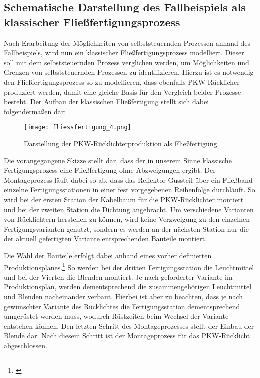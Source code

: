 \subsection{Schematische Darstellung des Fallbeispiels als klassischer
Fließfertigungsprozess}
\label{Modellierung}

Nach Erarbeitung der Möglichkeiten von selbststeuernden Prozessen anhand des
Fallbeispiels, wird nun ein klassischer Fließfertigungsprozess modelliert.
Dieser soll mit dem selbststeuernden Prozess verglichen werden, um Möglichkeiten
und Grenzen von selbststeuernden Prozessen zu identifizieren. Hierzu ist es
notwendig den Fließfertigungsprozess so zu modellieren, dass ebenfalls
PKW-Rücklicher produziert werden, damit eine gleiche Basis für den Vergleich
beider Prozesse besteht. Der Aufbau der klassischen Fließfertigung stellt sich
dabei folgendermaßen dar:

\begin{figure}[htb] 
\centering
\texttt{[image: fliessfertigung\_4.png]}
\caption[Darstellung der PKW-Rücklichterproduktion als
Fließfertigung]{Darstellung der PKW-Rücklichterproduktion als
Fließfertigung\protect\footnotemark}
\label{fig:Fliessfertigung}
\end{figure}

Die vorangegangene Skizze stellt dar, dass der in unserem Sinne klassische
Fertigungsprozess eine Fließfertigung ohne Abzweigungen ergibt. Der
Montageprozess läuft dabei so ab, dass das Reflektor-Gussteil über ein Fließband
einzelne Fertigungsstationen in einer fest vorgegebenen Reihenfolge durchläuft.
So wird bei der ersten Station der Kabelbaum für die PKW-Rücklichter montiert
und bei der zweiten Station die Dichtung angebracht. Um verschiedene Varianten
von Rücklichtern herstellen zu können, wird keine Verzweigung zu den einzelnen
Fertigungsvarianten genutzt, sondern es werden an der nächsten Station nur die
der aktuell gefertigten Variante entsprechenden Bauteile montiert.

Die Wahl der Bauteile erfolgt dabei anhand eines vorher definierten
Produktionsplanes.\footnote{\citet[S.~331]{arnold2008}} So werden bei der
dritten Fertigungsstation die Leuchtmittel und bei der Vierten die Blenden montiert. Je nach geforderter Variante im
Produktionsplan, werden dementsprechend die zusammengehörigen Leuchtmittel und
Blenden nacheinander verbaut. Hierbei ist aber zu beachten, dass je nach
gewünschter Variante des Rücklichtes die Fertigungsstation dementsprechend
umgerüstet werden muss, wodurch Rüstzeiten beim Wechsel der Variante entstehen
können. Den letzten Schritt des Montageprozesses stellt der Einbau der Blende
dar. Nach diesem Schritt ist der Montageprozess für das PKW-Rücklicht
abgeschlossen.
 